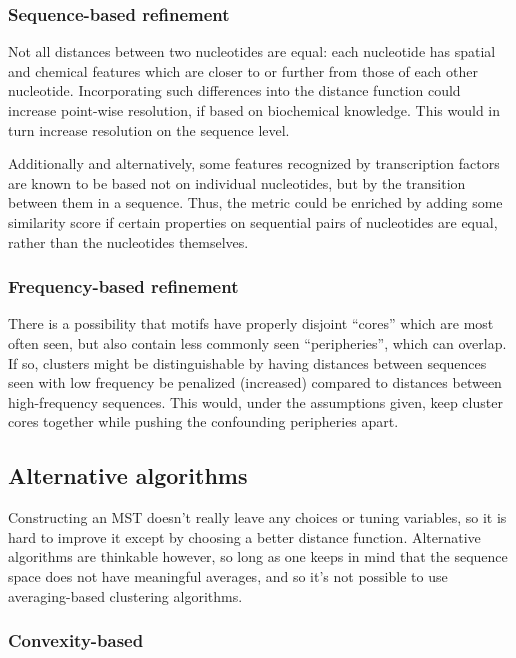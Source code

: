 \documentclass[fleqn]{book}
\begin{document}
\subsubsection{Sequence-based
refinement}\label{sequence-based-refinement}

Not all distances between two nucleotides are equal: each nucleotide has
spatial and chemical features which are closer to or further from those
of each other nucleotide. Incorporating such differences into the
distance function could increase point-wise resolution, if based on
biochemical knowledge. This would in turn increase resolution on the
sequence level.

Additionally and alternatively, some features recognized by
transcription factors are known to be based not on individual
nucleotides, but by the transition between them in a sequence. Thus, the
metric could be enriched by adding some similarity score if certain
properties on sequential pairs of nucleotides are equal, rather than the
nucleotides themselves.

\subsubsection{Frequency-based
refinement}\label{frequency-based-refinement}

There is a possibility that motifs have properly disjoint ``cores''
which are most often seen, but also contain less commonly seen
``peripheries'', which can overlap. If so, clusters might be
distinguishable by having distances between sequences seen with low
frequency be penalized (increased) compared to distances between
high-frequency sequences. This would, under the assumptions given, keep
cluster cores together while pushing the confounding peripheries apart.

\subsection{Alternative algorithms}\label{alternative-algorithms}

Constructing an MST doesn't really leave any choices or tuning
variables, so it is hard to improve it except by choosing a better
distance function. Alternative algorithms are thinkable however, so long
as one keeps in mind that the sequence space does not have meaningful
averages, and so it's not possible to use averaging-based clustering
algorithms.

\subsubsection{Convexity-based}\label{convexity-based}
\end{document}
